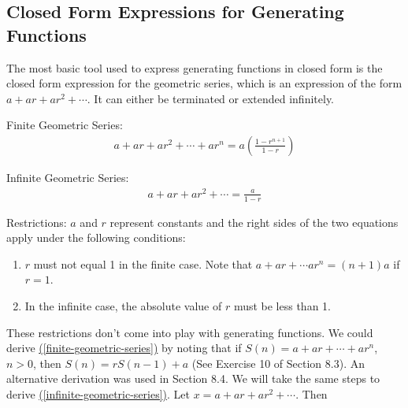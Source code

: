 \documentclass[10pt,]{book}
\theoremstyle{plain}
\theoremstyle{definition}
\theoremstyle{definition}
\theoremstyle{definition}
\theoremstyle{definition}
\numberwithin{equation}{section}
\begin{document}
\subsection[Closed Form Expressions for Generating Functions]{Closed Form Expressions for Generating Functions}\label{ss-closed-form-expressions-for-generating-functions}
The most basic tool used to express generating functions in closed form is the closed form expression for the geometric series, which is an expression
of the form \(a + a r + a r^2+ \cdots\). It can either be terminated or extended infinitely.%
\par
Finite Geometric Series: 
\begin{gather}
a + a r + a r^2+ \cdots +a r^n= a(\frac{1-r^{n+1}}{1-r})
\label{finite-geometric-series}
\end{gather} %
\par
Infinite Geometric Series:
\begin{gather}
a + a r + a r^2+ \cdots = \frac{a}{1-r}
\label{infinite-geometric-series}
\end{gather} %
\par
Restrictions: 
\(a\) and \(r\) represent constants and the right sides of the two equations apply under the following conditions:%
\par
\leavevmode%
\begin{enumerate}[label=\arabic*]
\item\hypertarget{li-91}{}\(r\) must not equal 1 in the finite case. Note that \(a + a r + \cdots  a r^n = (n + 1)a\) if\(r = 1\).%
\item\hypertarget{li-92}{} In the infinite case, the absolute value of \(r\) must be less than 1.%
\end{enumerate}
%
\par
These restrictions don't come into play with generating functions. We could derive \hyperref[finite-geometric-series]{(\ref{finite-geometric-series})} by noting that if \(S(n) = a + a r +\cdots  + a r^n\), \(n
> 0\), then \(S(n) = r S(n - 1) + a\) (See Exercise 10 of Section 8.3). An alternative derivation was used in Section 8.4. We will take the same
steps to derive \hyperref[infinite-geometric-series]{(\ref{infinite-geometric-series})}. Let \(x = a + a r + a r^2 + \cdots \).  Then
\end{document}
